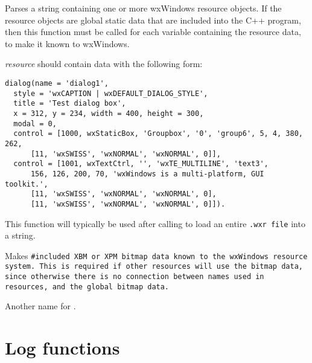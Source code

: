 
Parses a string containing one or more wxWindows resource objects. If
the resource objects are global static data that are included into the
C++ program, then this function must be called for each variable
containing the resource data, to make it known to wxWindows.

{\it resource} should contain data with the following form:

\begin{verbatim}
dialog(name = 'dialog1',
  style = 'wxCAPTION | wxDEFAULT_DIALOG_STYLE',
  title = 'Test dialog box',
  x = 312, y = 234, width = 400, height = 300,
  modal = 0,
  control = [1000, wxStaticBox, 'Groupbox', '0', 'group6', 5, 4, 380, 262,
      [11, 'wxSWISS', 'wxNORMAL', 'wxNORMAL', 0]],
  control = [1001, wxTextCtrl, '', 'wxTE_MULTILINE', 'text3',
      156, 126, 200, 70, 'wxWindows is a multi-platform, GUI toolkit.',
      [11, 'wxSWISS', 'wxNORMAL', 'wxNORMAL', 0],
      [11, 'wxSWISS', 'wxNORMAL', 'wxNORMAL', 0]]).
\end{verbatim}

This function will typically be used after calling  to
load an entire {\tt .wxr file} into a string.

\label{registerbitmapdata}



Makes \tt{#}included XBM or XPM bitmap data known to the wxWindows resource system.
This is required if other resources will use the bitmap data, since otherwise there
is no connection between names used in resources, and the global bitmap data.


Another name for .

\section{Log functions}\label{logfunctions}


